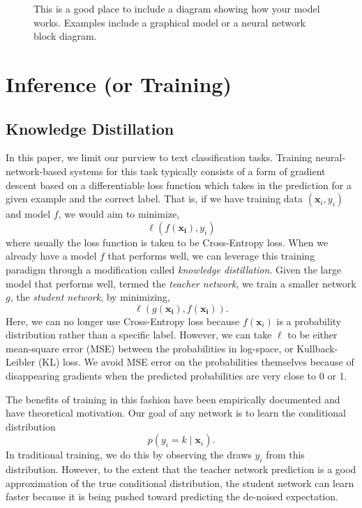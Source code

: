 \documentclass[11pt]{article}
\begin{document}
\begin{figure}
  \centering
  \missingfigure[figheight=8cm]{}
  \caption{\label{fig:diagram} This is a good place to include a diagram showing how your model works. Examples include a graphical model or a neural network block diagram.}
\end{figure}

\section{Inference (or Training)}
\label{sec:training}


\subsection{Knowledge Distillation}
\label{subsec:kd}

In this paper, we limit our purview to text classification tasks. Training
neural-network-based systems for this task typically consists of a form of
gradient descent based on a differentiable loss function which takes in the
prediction for a given example and the correct label. That is, if we have
training data $(\bm{x}_i, y_i)$ and model $f$, we would aim to minimize,
\[ \ell(f(\bm{x_i}), y_i)\]
where usually the loss function is taken to be Cross-Entropy loss. When we
already have a model $f$ that performs well, we can leverage this training
paradigm through a modification called \emph{knowledge distillation}. Given the
large model that performs well, termed the \emph{teacher network}, we train a
smaller network $g$, the \emph{student network}, by minimizing,
\[ \ell(g(\bm{x_i}), f(\bm{x_i})).\]
Here, we can no longer use Cross-Entropy loss because $f(\bm{x}_i)$ is a
probability distribution rather than a specific label. However, we can take
$\ell$ to be either mean-square error (MSE) between the probabilities in
log-space, or Kullback-Leibler (KL) loss. We avoid MSE error on the
probabilities themselves because of disappearing gradients when the predicted
probabilities are very close to 0 or 1.

The benefits of training in this fashion have been empirically documented
\citep{hinton2015distilling}
and have theoretical motivation. Our goal of any network is to learn the
conditional distribution 
\[ p(y_i = k \mid \bm{x}_i).\]
In traditional training, we do this by observing the draws $y_i$ from this
distribution. However, to the extent that the teacher network prediction is a
good approximation of the true conditional distribution, the student network can
learn faster because it is being pushed toward predicting the de-noised
expectation.
\end{document}
